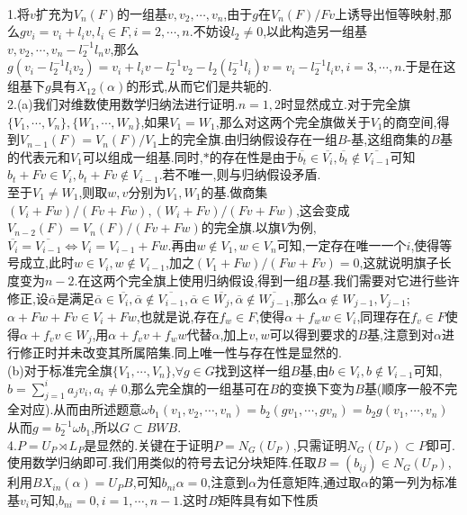 \documentclass[b5paper]{ctexart}
\begin{document}
\pagestyle{plain}
\noindent
\\
1.将$v$扩充为$V_n(F)$的一组基$v,v_2,\cdots,v_n$,由于$g$在$V_n(F)/Fv$上诱导出恒等映射,那么$gv_i=v_i+l_iv,l_i\in F,i=2,\cdots,n$.不妨设$l_2\neq 0$,以此构造另一组基$v,v_2,\cdots,v_n-l_2^{-1}l_nv$,那么$g(v_i-l_2^{-1}l_iv_2)=v_i+l_iv-l_2^{-1}v_2-l_2(l_2^{-1}l_i)v=v_i-l_2^{-1}l_iv,i=3,\cdots,n$.于是在这组基下$g$具有$X_{12}(\alpha)$的形式,从而它们是共轭的.\\
2.(a)我们对维数使用数学归纳法进行证明.$n=1,2$时显然成立.对于完全旗\\
$\{V_1,\cdots,V_n\},\{W_1,\cdots,W_n\}$,如果$V_1=W_1$,那么对这两个完全旗做关于$V_1$的商空间,得到$V_{n-1}(F)=V_{n}(F)/V_1$上的完全旗.由归纳假设存在一组$B$-基,这组商集的$B$基的代表元和$V_1$可以组成一组基.同时,$*$的存在性是由于$\overline
{b_t}\in\overline{V_i},\overline{b_t}\notin\overline{V_{i-1}}$可知$b_t+Fv\in V_i,b_t+Fv\notin V_{i-1}$.若不唯一,则与归纳假设矛盾.\\
至于$V_1\neq W_1$,则取$w,v$分别为$V_1,W_1$的基.做商集$(V_i+Fw)/(Fv+Fw),(W_i+Fv)/(Fv+Fw)$,这会变成$V_{n-2}(F)=V_n(F)/(Fv+Fw)$的完全旗.以旗$V$为例,$\overline{V_i}=\overline{V_{i-1}}\Leftrightarrow V_i=V_{i-1}+Fw$.再由$w\notin V_1,w\in V_n$可知,一定存在唯一一个$i$,使得等号成立,此时$w\in V_i,w\notin V_{i-1}$,加之$(V_1+Fw)/(Fw+Fv)=0$,这就说明旗子长度变为$n-2
$.在这两个完全旗上使用归纳假设,得到一组$B$基.我们需要对它进行些许修正,设$\overline{\alpha}$是满足$\overline{\alpha}\in\overline{V_i},\overline{\alpha}\notin\overline{V_{i-1}},\overline{\alpha}\in\overline{W_j},\overline{\alpha}\notin\overline{W_{j-1}}$,那么$\alpha\notin W_{j-1},V_{j-1}$; $\alpha+Fw+Fv\in V_i+Fw$,也就是说,存在$f_w\in F$,使得$\alpha+f_ww\in V_i$,同理存在$f_v\in F$使得$\alpha+f_vv\in W_j$,用$\alpha+f_vv+f_ww$代替$\alpha$,加上$v,w$可以得到要求的$B$基,注意到对$\alpha$进行修正时并未改变其所属陪集.同上唯一性与存在性是显然的.\\
(b)对于标准完全旗$\{V_1,\cdots,V_n\}$,$\forall g\in G$找到这样一组$B$基,由$b\in V_i,b\notin V_{i-1}$可知,$b=\sum_{j=1}^ia_jv_i,a_i\neq 0$,那么完全旗的一组基可在$B$的变换下变为$B$基(顺序一般不完全对应).从而由所述题意$\omega b_1(v_1,v_2,\cdots,v_n)= b_2(gv_1,\cdots,gv_n)=b_2g(v_1,\cdots,v_n)$从而$g=b^{-1}_2\omega b_1$,所以$G\subset BWB$.\\
4.$P= U_P\rtimes L_P$是显然的.关键在于证明$P=N_G(U_P)$,只需证明$N_G(U_P)\subset P$即可.使用数学归纳即可.我们用类似的符号去记分块矩阵.任取$B=(b_{ij})\in N_G(U_P)$,利用$BX_{in}(\alpha)=U_PB$,可知$b_{ni}\alpha=0$,注意到$\alpha$为任意矩阵,通过取$\alpha$的第一列为标准基$v_i$可知,$b_{ni}=0,i=1,\cdots,n-1$.这时$B$矩阵具有如下性质
\end{document}

